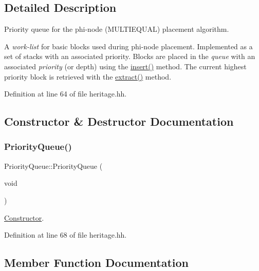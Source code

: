 \subsection{Detailed Description}
Priority queue for the phi-\/node (M\+U\+L\+T\+I\+E\+Q\+U\+AL) placement algorithm. 

A {\itshape work-\/list} for basic blocks used during phi-\/node placement. Implemented as a set of stacks with an associated priority. Blocks are placed in the {\itshape queue} with an associated {\itshape priority} (or depth) using the \mbox{\hyperlink{class_priority_queue_a8abe49ecb70033726324497f4aafdb74}{insert()}} method. The current highest priority block is retrieved with the \mbox{\hyperlink{class_priority_queue_a6cd7194cc2cb973f33158a1d7dc7acc9}{extract()}} method. 

Definition at line 64 of file heritage.\+hh.



\subsection{Constructor \& Destructor Documentation}
\mbox{\label{class_priority_queue_ad59a188ea9e264c9d8567213d128dfd4}} 
\subsubsection{\texorpdfstring{PriorityQueue()}{PriorityQueue()}}
{\footnotesize\ttfamily Priority\+Queue\+::\+Priority\+Queue (\begin{DoxyParamCaption}\item[{void}]{ }\end{DoxyParamCaption})\hspace{0.3cm}{\ttfamily [inline]}}



\mbox{\hyperlink{class_constructor}{Constructor}}. 



Definition at line 68 of file heritage.\+hh.



\subsection{Member Function Documentation}
\mbox{\label{class_priority_queue_aa52c8c07deead26f255cdbe92a0acd4e}} 
